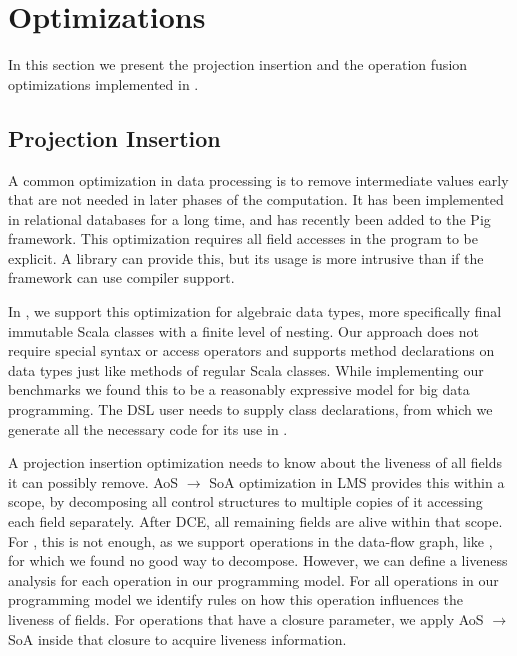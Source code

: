 \section{Optimizations}
\label{sec:optimizations}
In this section we present the projection insertion and the operation fusion
optimizations implemented in \tool.
\subsection{Projection Insertion}
\label{sec:field-reduction}
\newcommand{\aos}{AoS $\rightarrow$ SoA }

A common optimization in data processing is to remove intermediate values early
that are not needed in later phases of the computation. It has been implemented
in relational databases for a long time, and has recently been added to the Pig
framework. This optimization requires all field accesses in the program to be
explicit. A library can provide this, but its usage is more intrusive than if
the framework can use compiler support.

In \tool, we support this optimization for algebraic data types, more
specifically final immutable Scala classes with a finite level of nesting. Our
approach does not require special syntax or access operators and supports method
declarations on data types just like methods of regular Scala classes. While
implementing our benchmarks we found this to be a reasonably expressive model
for big data programming. The DSL user needs to supply class declarations, from
which we generate all the necessary code for its use in \tool.

A projection insertion optimization needs to know about the liveness of all
fields it can possibly remove. \aos optimization in LMS provides this within a
scope, by decomposing all control structures to multiple copies of it accessing
each field separately. After DCE, all remaining fields are alive within that
scope. For \tool, this is not enough, as we support operations in the data-flow
graph, like , for which we found no good way to decompose.
However, we can define a liveness analysis for each operation in our programming
model. For all operations in our programming model we identify rules on how this
operation influences the liveness of fields. For operations that have a closure
parameter, we apply \aos inside that closure to acquire liveness information.

